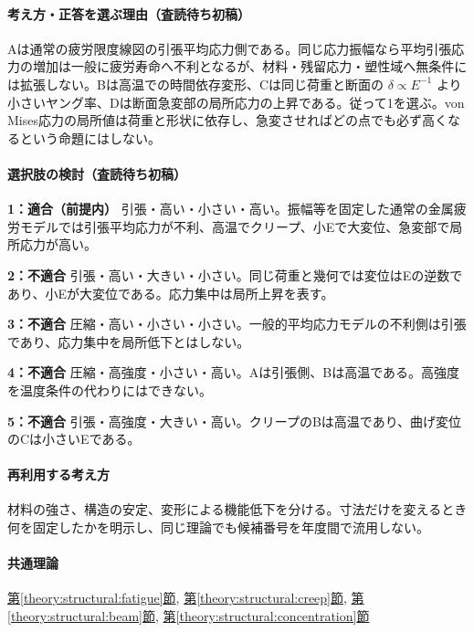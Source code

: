 \paragraph{考え方・正答を選ぶ理由（査読待ち初稿）} Aは通常の疲労限度線図の引張平均応力側である。同じ応力振幅なら平均引張応力の増加は一般に疲労寿命へ不利となるが、材料・残留応力・塑性域へ無条件には拡張しない。Bは高温での時間依存変形、Cは同じ荷重と断面の \(\delta\propto E^{-1}\) より小さいヤング率、Dは断面急変部の局所応力の上昇である。従って1を選ぶ。von Mises応力の局所値は荷重と形状に依存し、急変させればどの点でも必ず高くなるという命題にはしない。

\paragraph{選択肢の検討（査読待ち初稿）}\mbox{}\par

\noindent\textbf{1：適合（前提内）} 引張・高い・小さい・高い。振幅等を固定した通常の金属疲労モデルでは引張平均応力が不利、高温でクリープ、小Eで大変位、急変部で局所応力が高い。\par

\noindent\textbf{2：不適合} 引張・高い・大きい・小さい。同じ荷重と幾何では変位はEの逆数であり、小Eが大変位である。応力集中は局所上昇を表す。\par

\noindent\textbf{3：不適合} 圧縮・高い・小さい・小さい。一般的平均応力モデルの不利側は引張であり、応力集中を局所低下とはしない。\par

\noindent\textbf{4：不適合} 圧縮・高強度・小さい・高い。Aは引張側、Bは高温である。高強度を温度条件の代わりにはできない。\par

\noindent\textbf{5：不適合} 引張・高強度・大きい・高い。クリープのBは高温であり、曲げ変位のCは小さいEである。\par

\paragraph{再利用する考え方} 材料の強さ、構造の安定、変形による機能低下を分ける。寸法だけを変えるとき何を固定したかを明示し、同じ理論でも候補番号を年度間で流用しない。

\paragraph{共通理論} \hyperref[theory:structural:fatigue]{第\ref*{theory:structural:fatigue}節}, \hyperref[theory:structural:creep]{第\ref*{theory:structural:creep}節}, \hyperref[theory:structural:beam]{第\ref*{theory:structural:beam}節}, \hyperref[theory:structural:concentration]{第\ref*{theory:structural:concentration}節}

